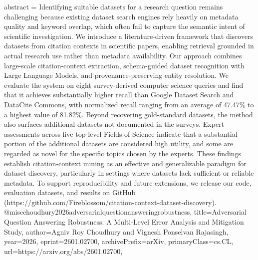 {      abstract = {Identifying suitable datasets for a research question remains challenging because existing dataset search engines rely heavily on metadata quality and keyword overlap, which often fail to capture the semantic intent of scientific investigation. We introduce a literature-driven framework that discovers datasets from citation contexts in scientific papers, enabling retrieval grounded in actual research use rather than metadata availability. Our approach combines large-scale citation-context extraction, schema-guided dataset recognition with Large Language Models, and provenance-preserving entity resolution. We evaluate the system on eight survey-derived computer science queries and find that it achieves substantially higher recall than Google Dataset Search and DataCite Commons, with normalized recall ranging from an average of 47.47\% to a highest value of 81.82\%. Beyond recovering gold-standard datasets, the method also surfaces additional datasets not documented in the surveys. Expert assessments across five top-level Fields of Science indicate that a substantial portion of the additional datasets are considered high utility, and some are regarded as novel for the specific topics chosen by the experts. These findings establish citation-context mining as an effective and generalizable paradigm for dataset discovery, particularly in settings where datasets lack sufficient or reliable metadata. To support reproducibility and future extensions, we release our code, evaluation datasets, and results on GitHub (https://github.com/Fireblossom/citation-context-dataset-discovery).}
}@misc{choudhury2026adversarialquestionansweringrobustness,
      title={Adversarial Question Answering Robustness: A Multi-Level Error Analysis and Mitigation Study}, 
      author={Agniv Roy Choudhury and Vignesh Ponselvan Rajasingh},
      year={2026},
      eprint={2601.02700},
      archivePrefix={arXiv},
      primaryClass={cs.CL},
      url={https://arxiv.org/abs/2601.02700},
}

